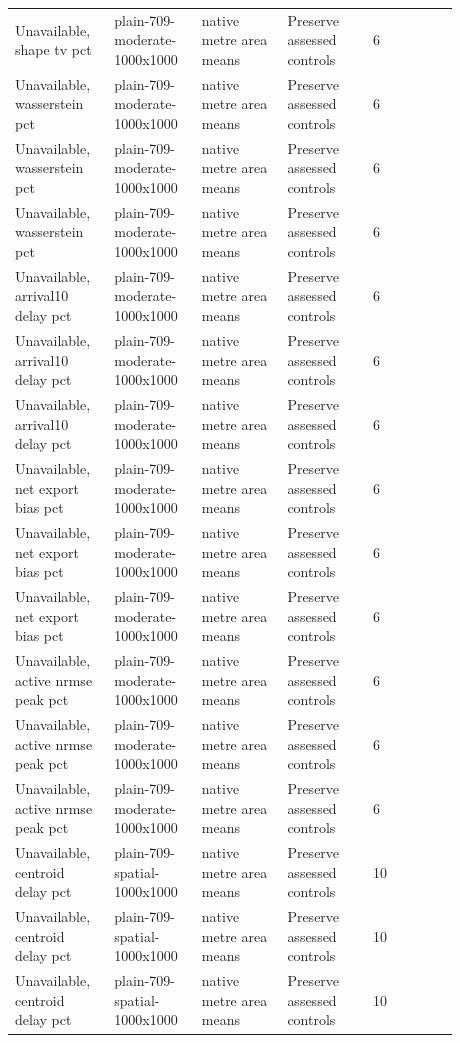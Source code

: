 \begin{longtable}{p{0.1760\linewidth}p{0.1760\linewidth}p{0.1760\linewidth}p{0.1760\linewidth}p{0.1760\linewidth}}
Unavailable, shape tv pct & plain-709-moderate-1000x1000 & native metre area means & Preserve assessed controls & 6 \\
Unavailable, wasserstein pct & plain-709-moderate-1000x1000 & native metre area means & Preserve assessed controls & 6 \\
Unavailable, wasserstein pct & plain-709-moderate-1000x1000 & native metre area means & Preserve assessed controls & 6 \\
Unavailable, wasserstein pct & plain-709-moderate-1000x1000 & native metre area means & Preserve assessed controls & 6 \\
Unavailable, arrival10 delay pct & plain-709-moderate-1000x1000 & native metre area means & Preserve assessed controls & 6 \\
Unavailable, arrival10 delay pct & plain-709-moderate-1000x1000 & native metre area means & Preserve assessed controls & 6 \\
Unavailable, arrival10 delay pct & plain-709-moderate-1000x1000 & native metre area means & Preserve assessed controls & 6 \\
Unavailable, net export bias pct & plain-709-moderate-1000x1000 & native metre area means & Preserve assessed controls & 6 \\
Unavailable, net export bias pct & plain-709-moderate-1000x1000 & native metre area means & Preserve assessed controls & 6 \\
Unavailable, net export bias pct & plain-709-moderate-1000x1000 & native metre area means & Preserve assessed controls & 6 \\
Unavailable, active nrmse peak pct & plain-709-moderate-1000x1000 & native metre area means & Preserve assessed controls & 6 \\
Unavailable, active nrmse peak pct & plain-709-moderate-1000x1000 & native metre area means & Preserve assessed controls & 6 \\
Unavailable, active nrmse peak pct & plain-709-moderate-1000x1000 & native metre area means & Preserve assessed controls & 6 \\
Unavailable, centroid delay pct & plain-709-spatial-1000x1000 & native metre area means & Preserve assessed controls & 10 \\
Unavailable, centroid delay pct & plain-709-spatial-1000x1000 & native metre area means & Preserve assessed controls & 10 \\
Unavailable, centroid delay pct & plain-709-spatial-1000x1000 & native metre area means & Preserve assessed controls & 10 \\

\end{longtable}
